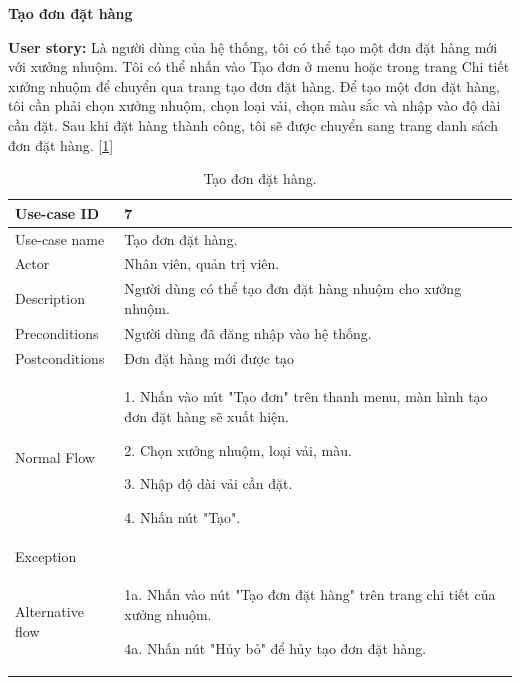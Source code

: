\newpage
\textbf{Tạo đơn đặt hàng}\par
\textbf{User story:} Là người dùng của hệ thống, tôi có thể tạo một đơn đặt hàng mới với xưởng nhuộm. Tôi có thể nhấn vào Tạo đơn ở menu hoặc trong trang Chi tiết xưởng nhuộm để chuyển qua trang tạo đơn đặt hàng. Để tạo một đơn đặt hàng, tôi cần phải chọn xưởng nhuộm, chọn loại vải, chọn màu sắc và nhập vào độ dài cần đặt. Sau khi đặt hàng thành công, tôi sẽ được chuyển sang trang danh sách đơn đặt hàng. [\ref{bang7}]
\begin{table}[!htp]
    \centering
    \begin{tabular}{|m{3cm}|m{10cm}|}
    \hline 
        Use-case ID & 7\\ \hline
        Use-case name & Tạo đơn đặt hàng.\\ \hline
        Actor & Nhân viên, quản trị viên.\\ \hline
        Description & Người dùng có thể tạo đơn đặt hàng nhuộm cho xưởng nhuộm.\\ \hline
        Preconditions & Người dùng đã đăng nhập vào hệ thống.\\ \hline
        Postconditions & Đơn đặt hàng mới được tạo\\ \hline
        Normal Flow & 
        1. Nhấn vào nút "Tạo đơn" trên thanh menu, màn hình tạo đơn đặt hàng sẽ xuất hiện.\par
        2. Chọn xưởng nhuộm, loại vải, màu.\par
        3. Nhập độ dài vải cần đặt.\par
        4. Nhấn nút "Tạo".
        \\ \hline
        Exception & \\ \hline
        Alternative flow & 
        1a. Nhấn vào nút "Tạo đơn đặt hàng" trên trang chi tiết của xưởng nhuộm.\par
        4a. Nhấn nút "Hủy bỏ" để hủy tạo đơn đặt hàng.
        \\ 
    \hline 
    \end{tabular}
    \caption{Tạo đơn đặt hàng.}
    \label{bang7}
\end{table}


